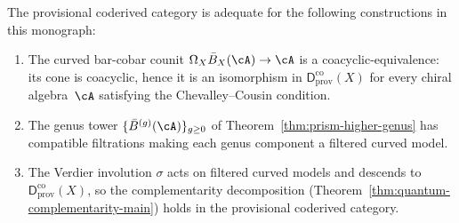\begin{proposition}
\label{prop:coderived-adequacy}
The provisional coderived category is adequate for the following
constructions in this monograph:
\begin{enumerate}[label=\textup{(\alph*)}]
\item The curved bar-cobar counit
 $\Omega_X \bar{B}_X(\cA) \to \cA$ is a coacyclic-equivalence:
 its cone is coacyclic, hence it is an isomorphism
 in $\mathsf{D}^{\mathrm{co}}_{\mathrm{prov}}(X)$ for every chiral
 algebra~$\cA$ satisfying the Chevalley--Cousin condition.
\item The genus tower $\{\bar{B}^{(g)}(\cA)\}_{g \geq 0}$ of
Theorem~\textup{\ref{thm:prism-higher-genus}} has compatible
filtrations making each genus component a filtered curved model.
\item The Verdier involution $\sigma$ acts on filtered curved models
and descends to $\mathsf{D}^{\mathrm{co}}_{\mathrm{prov}}(X)$,
 so the complementarity decomposition
 \textup{(}Theorem~\textup{\ref{thm:quantum-complementarity-main})}
 holds in the provisional coderived category.
\end{enumerate}
\end{proposition}

